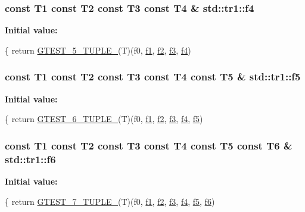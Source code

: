 \subsubsection[{f4}]{\setlength{\rightskip}{0pt plus 5cm}const T1 const T2 const T3 const T4 \& std\+::tr1\+::f4}\label{namespacestd_1_1tr1_adc796e02b7385d526aff708189564f67}
{\bfseries Initial value\+:}
\begin{DoxyCode}
\{
  \textcolor{keywordflow}{return} \hyperlink{gtest-tuple_8h_a64e6f4a4cf55f62cde94066c6d5d5c74}{GTEST\_5\_TUPLE\_}(T)(f0, \hyperlink{namespacestd_1_1tr1_a9c0fa65b105f8e2f58ba59ecf75fd000}{f1}, \hyperlink{namespacestd_1_1tr1_a87dd9e009868361317f587126dba63d4}{f2}, \hyperlink{namespacestd_1_1tr1_a0f7c3b47d27d42d82d1a333ea420ce4e}{f3}, \hyperlink{namespacestd_1_1tr1_adc796e02b7385d526aff708189564f67}{f4})
\end{DoxyCode}
\hypertarget{namespacestd_1_1tr1_a9c1eb66b2b2fa321942af95405232a0d}{}
\subsubsection[{f5}]{\setlength{\rightskip}{0pt plus 5cm}const T1 const T2 const T3 const T4 const T5 \& std\+::tr1\+::f5}\label{namespacestd_1_1tr1_a9c1eb66b2b2fa321942af95405232a0d}
{\bfseries Initial value\+:}
\begin{DoxyCode}
\{
  \textcolor{keywordflow}{return} \hyperlink{gtest-tuple_8h_a53f36c86a979ed8285bf3c6f82f16483}{GTEST\_6\_TUPLE\_}(T)(f0, \hyperlink{namespacestd_1_1tr1_a9c0fa65b105f8e2f58ba59ecf75fd000}{f1}, \hyperlink{namespacestd_1_1tr1_a87dd9e009868361317f587126dba63d4}{f2}, \hyperlink{namespacestd_1_1tr1_a0f7c3b47d27d42d82d1a333ea420ce4e}{f3}, \hyperlink{namespacestd_1_1tr1_adc796e02b7385d526aff708189564f67}{f4}, \hyperlink{namespacestd_1_1tr1_a9c1eb66b2b2fa321942af95405232a0d}{f5})
\end{DoxyCode}
\hypertarget{namespacestd_1_1tr1_a6b62f32e1e3e21bceb94eb46c4cbfd56}{}
\subsubsection[{f6}]{\setlength{\rightskip}{0pt plus 5cm}const T1 const T2 const T3 const T4 const T5 const T6 \& std\+::tr1\+::f6}\label{namespacestd_1_1tr1_a6b62f32e1e3e21bceb94eb46c4cbfd56}
{\bfseries Initial value\+:}
\begin{DoxyCode}
\{
  \textcolor{keywordflow}{return} \hyperlink{gtest-tuple_8h_a8987baf82ee028d1d778447413a02c0c}{GTEST\_7\_TUPLE\_}(T)(f0, \hyperlink{namespacestd_1_1tr1_a9c0fa65b105f8e2f58ba59ecf75fd000}{f1}, \hyperlink{namespacestd_1_1tr1_a87dd9e009868361317f587126dba63d4}{f2}, \hyperlink{namespacestd_1_1tr1_a0f7c3b47d27d42d82d1a333ea420ce4e}{f3}, \hyperlink{namespacestd_1_1tr1_adc796e02b7385d526aff708189564f67}{f4}, \hyperlink{namespacestd_1_1tr1_a9c1eb66b2b2fa321942af95405232a0d}{f5}, \hyperlink{namespacestd_1_1tr1_a6b62f32e1e3e21bceb94eb46c4cbfd56}{f6})
\end{DoxyCode}
\hypertarget{namespacestd_1_1tr1_a2185f3a1c07f2df072c39cb91ffa89a4}{}
